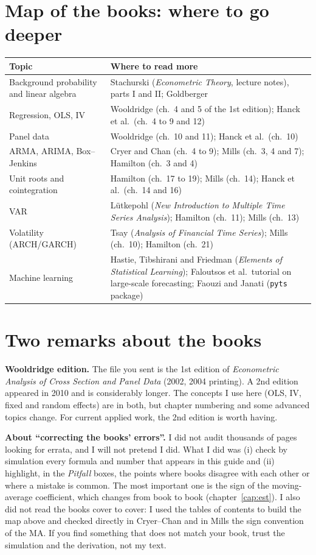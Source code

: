 \section*{Map of the books: where to go deeper}
\begin{center}
\small
\begin{tabular}{p{4.3cm}p{9.6cm}}
\toprule
\textbf{Topic} & \textbf{Where to read more} \\
\midrule
Background probability and linear algebra & Stachurski (\emph{Econometric Theory}, lecture notes), parts I and II; Goldberger \\
Regression, OLS, IV & Wooldridge (ch.\ 4 and 5 of the 1st edition); Hanck et al.\ (ch.\ 4 to 9 and 12) \\
Panel data & Wooldridge (ch.\ 10 and 11); Hanck et al.\ (ch.\ 10) \\
ARMA, ARIMA, Box--Jenkins & Cryer and Chan (ch.\ 4 to 9); Mills (ch.\ 3, 4 and 7); Hamilton (ch.\ 3 and 4) \\
Unit roots and cointegration & Hamilton (ch.\ 17 to 19); Mills (ch.\ 14); Hanck et al.\ (ch.\ 14 and 16) \\
VAR & Lütkepohl (\emph{New Introduction to Multiple Time Series Analysis}); Hamilton (ch.\ 11); Mills (ch.\ 13) \\
Volatility (ARCH/GARCH) & Tsay (\emph{Analysis of Financial Time Series}); Mills (ch.\ 10); Hamilton (ch.\ 21) \\
Machine learning & Hastie, Tibshirani and Friedman (\emph{Elements of Statistical Learning}); Faloutsos et al.\ tutorial on large-scale forecasting; Faouzi and Janati (\texttt{pyts} package) \\
\bottomrule
\end{tabular}
\end{center}

\section*{Two remarks about the books}
\textbf{Wooldridge edition.} The file you sent is the 1st edition of \emph{Econometric Analysis of Cross Section and Panel Data} (2002, 2004 printing). A 2nd edition appeared in 2010 and is considerably longer. The concepts I use here (OLS, IV, fixed and random effects) are in both, but chapter numbering and some advanced topics change. For current applied work, the 2nd edition is worth having.

\textbf{About ``correcting the books' errors''.} I did not audit thousands of pages looking for errata, and I will not pretend I did. What I did was (i) check by simulation every formula and number that appears in this guide and (ii) highlight, in the \emph{Pitfall} boxes, the points where books disagree with each other or where a mistake is common. The most important one is the sign of the moving-average coefficient, which changes from book to book (chapter~\ref{cap:est}). I also did not read the books cover to cover: I used the tables of contents to build the map above and checked directly in Cryer--Chan and in Mills the sign convention of the MA. If you find something that does not match your book, trust the simulation and the derivation, not my text.

